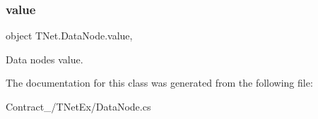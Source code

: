 \subsubsection{\texorpdfstring{value}{value}}
{\footnotesize\ttfamily object T\+Net.\+Data\+Node.\+value\hspace{0.3cm}{\ttfamily [get]}, {\ttfamily [set]}}



Data node\textquotesingle{}s value. 



The documentation for this class was generated from the following file\+:\begin{DoxyCompactItemize}
\item 
Contract\+\_\+/\+T\+Net\+Ex/Data\+Node.\+cs\end{DoxyCompactItemize}
